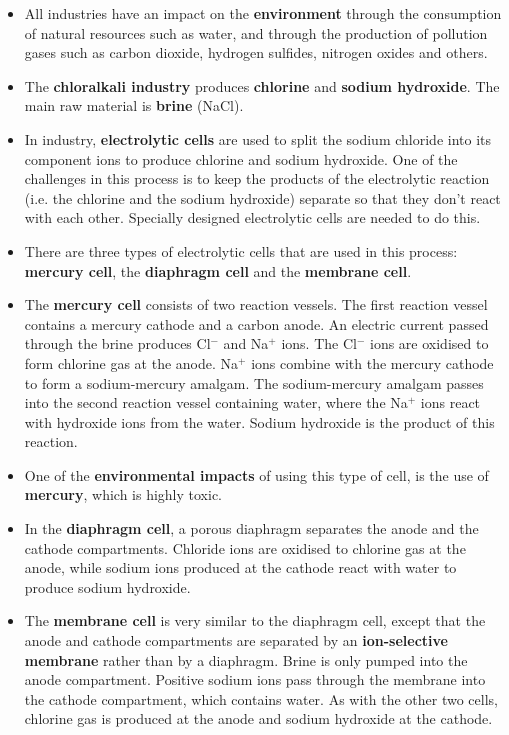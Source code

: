 \begin{itemize}
\item{All industries have an impact on the \textbf{environment} through the consumption of natural resources such as water, and through the production of pollution gases such as carbon dioxide, hydrogen sulfides, nitrogen oxides and others.}
\item{The \textbf{chloralkali industry} produces \textbf{chlorine} and \textbf{sodium hydroxide}. The main raw material is \textbf{brine} (NaCl).}
\item{In industry, \textbf{electrolytic cells} are used to split the sodium chloride into its component ions to produce chlorine and sodium hydroxide. One of the challenges in this process is to keep the products of the electrolytic reaction (i.e. the chlorine and the sodium hydroxide) separate so that they don't react with each other. Specially designed electrolytic cells are needed to do this.}
\item{There are three types of electrolytic cells that are used in this process: \textbf{mercury cell}, the \textbf{diaphragm cell} and the \textbf{membrane cell}.}
\item{The \textbf{mercury cell} consists of two reaction vessels. The first reaction vessel contains a mercury cathode and a carbon anode. An electric current passed through the brine produces Cl$^{-}$ and Na$^{+}$ ions. The Cl$^{-}$ ions are oxidised to form chlorine gas at the anode. Na$^{+}$ ions combine with the mercury cathode to form a sodium-mercury amalgam.  The sodium-mercury amalgam passes into the second reaction vessel containing water, where the Na$^{+}$ ions react with hydroxide ions from the water. Sodium hydroxide is the product of this reaction.}
\item{One of the \textbf{environmental impacts} of using this type of cell, is the use of \textbf{mercury}, which is highly toxic.}
\item{In the \textbf{diaphragm cell}, a porous diaphragm separates the anode and the cathode compartments. Chloride ions are oxidised to chlorine gas at the anode, while sodium ions produced at the cathode react with water to produce sodium hydroxide.}
\item{The \textbf{membrane cell} is very similar to the diaphragm cell, except that the anode and cathode compartments are separated by an \textbf{ion-selective membrane} rather than by a diaphragm. Brine is only pumped into the anode compartment. Positive sodium ions pass through the membrane into the cathode compartment, which contains water. As with the other two cells, chlorine gas is produced at the anode and sodium hydroxide at the cathode.}

\end{itemize}
